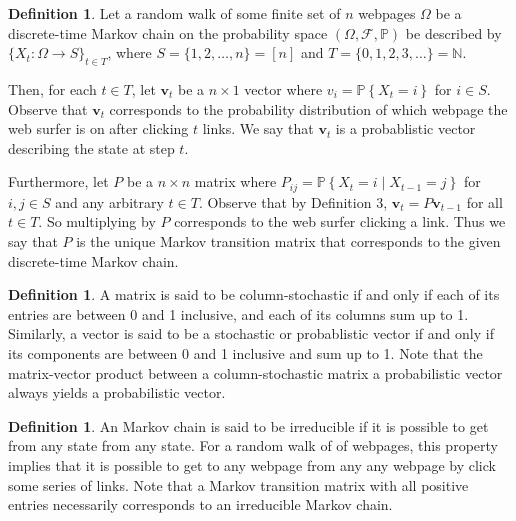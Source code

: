 \documentclass[11pt]{article}
\theoremstyle{definition}
\newtheorem{definition}[theorem]{Definition}
\newcommand{\N}{\mathbb{N}}
\newcommand{\p}[1]{\mathbb{P}\left\{#1\right\}}
\renewcommand{\vec}[1]{\mathbf{#1}}
\begin{document}
\begin{definition}
    Let a random walk of some finite set of $n$ webpages $\Omega$ be a discrete-time Markov chain on the probability space $(\Omega, \mathcal{F}, \mathbb{P})$
    be described by $\{X_t : \Omega \to S\}_{t \in T}$, where $S = \{1, 2, \ldots, n\} = [n]$ and $T = \{0, 1, 2, 3, \ldots\} = \N$.
    
    Then, for each $t \in T$, let $\vec{v}_t$ be a $n \times 1$ vector
    where $v_i = \p{X_t = i}$ for $i \in S$.
    Observe that $\vec{v}_t$ corresponds to the probability distribution of which webpage the web surfer is on after clicking $t$ links.
    We say that $\vec{v}_t$ is a probablistic vector describing the state at step $t$.

    Furthermore, let $P$ be a $n \times n$ matrix
    where $P_{ij} = \p{X_t = i \mid X_{t-1} = j}$ for $i, j \in S$ and any arbitrary $t \in T$. Observe that by Definition 3, $\vec{v}_t = P \vec{v}_{t-1}$ for all $t \in T$.
    So multiplying by $P$ corresponds to the web surfer clicking a link.
    Thus we say that $P$ is the unique Markov transition matrix that corresponds to the given discrete-time Markov chain.
\end{definition}

\begin{definition}
    A matrix is said to be column-stochastic if and only if each of its entries are between 0 and 1 inclusive, and each of its columns sum up to 1.
    Similarly, a vector is said to be a stochastic or probablistic vector if and only if its components are between 0 and 1 inclusive and sum up to 1.
    Note that the matrix-vector product between a column-stochastic matrix a probabilistic vector always yields a probabilistic vector.
\end{definition}

\begin{definition}
    An Markov chain is said to be irreducible if it is possible to get from any state from any state.
    For a random walk of of webpages, this property implies that it is possible to get to any webpage from any any webpage by click some series of links.
    Note that a Markov transition matrix with all positive entries necessarily corresponds to an irreducible Markov chain.
\end{definition}
\end{document}
